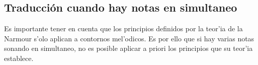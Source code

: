 \begin{imagen}
    \width{10cm}
\end{imagen}
\subsection{Traducci\'on cuando hay notas en simultaneo}
Es importante tener en cuenta que los principios definidos por la teor'ia de la Narmour s'olo aplican a contornos mel'odicos. Es por ello que si hay varias notas sonando en 
simultaneo, no es posible aplicar a priori los principios que su teor'ia establece. 
